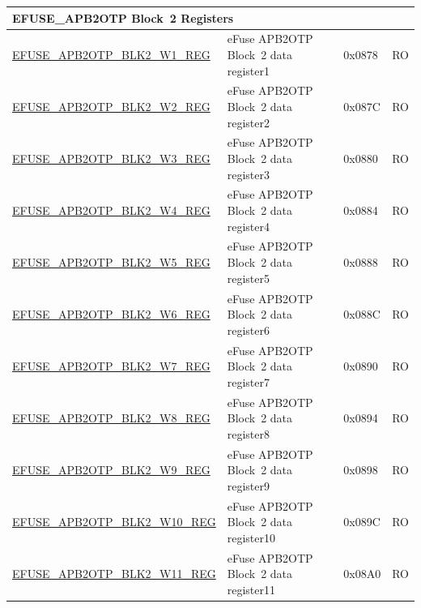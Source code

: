\begin{longtable}{ | p{7cm} | p{6cm} | p{1.2cm} | p{1.5cm} | }
\multicolumn{4}{|l|}{\textbf{EFUSE\_APB2OTP Block~2 Registers}} \\ \hline
\hyperref[regdesc:EFUSEAPB2OTPBLK2WNREG]{EFUSE\_APB2OTP\_BLK2\_W1\_REG} & eFuse APB2OTP Block~2 data register1 & 0x0878 & RO \\\hline
\hyperref[regdesc:EFUSEAPB2OTPBLK2WNREG]{EFUSE\_APB2OTP\_BLK2\_W2\_REG} & eFuse APB2OTP Block~2 data register2 & 0x087C & RO \\\hline
\hyperref[regdesc:EFUSEAPB2OTPBLK2WNREG]{EFUSE\_APB2OTP\_BLK2\_W3\_REG} & eFuse APB2OTP Block~2 data register3 & 0x0880 & RO \\\hline
\hyperref[regdesc:EFUSEAPB2OTPBLK2WNREG]{EFUSE\_APB2OTP\_BLK2\_W4\_REG} & eFuse APB2OTP Block~2 data register4 & 0x0884 & RO \\\hline
\hyperref[regdesc:EFUSEAPB2OTPBLK2WNREG]{EFUSE\_APB2OTP\_BLK2\_W5\_REG} & eFuse APB2OTP Block~2 data register5 & 0x0888 & RO \\\hline
\hyperref[regdesc:EFUSEAPB2OTPBLK2WNREG]{EFUSE\_APB2OTP\_BLK2\_W6\_REG} & eFuse APB2OTP Block~2 data register6 & 0x088C & RO \\\hline
\hyperref[regdesc:EFUSEAPB2OTPBLK2WNREG]{EFUSE\_APB2OTP\_BLK2\_W7\_REG} & eFuse APB2OTP Block~2 data register7 & 0x0890 & RO \\\hline
\hyperref[regdesc:EFUSEAPB2OTPBLK2WNREG]{EFUSE\_APB2OTP\_BLK2\_W8\_REG} & eFuse APB2OTP Block~2 data register8 & 0x0894 & RO \\\hline
\hyperref[regdesc:EFUSEAPB2OTPBLK2WNREG]{EFUSE\_APB2OTP\_BLK2\_W9\_REG} & eFuse APB2OTP Block~2 data register9 & 0x0898 & RO \\\hline
\hyperref[regdesc:EFUSEAPB2OTPBLK2WNREG]{EFUSE\_APB2OTP\_BLK2\_W10\_REG} & eFuse APB2OTP Block~2 data register10 & 0x089C & RO \\\hline
\hyperref[regdesc:EFUSEAPB2OTPBLK2WNREG]{EFUSE\_APB2OTP\_BLK2\_W11\_REG} & eFuse APB2OTP Block~2 data register11 & 0x08A0 & RO \\ \hline


\end{longtable}
